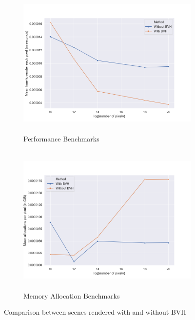 \documentclass{juliacon}
\begin{document}
\begin{figure}[!htb]
    \centering
    \begin{subfigure}[c]{0.45\textwidth}
        \includegraphics[height=75mm, width=\textwidth]{images/performance-speed.png}
        \caption{Performance Benchmarks}
        \label{fig:bvh_perf}
    \end{subfigure}
    \hfill
    \begin{subfigure}[c]{0.45\textwidth}
        \includegraphics[height=75mm, width=\textwidth]{images/performance-memory.png}
        \caption{Memory Allocation Benchmarks}
        \label{fig:bvh_mem}
    \end{subfigure}
    \caption{Comparison between scenes rendered with and without BVH}
    \label{fig:bvh}
\end{figure}
\end{document}
